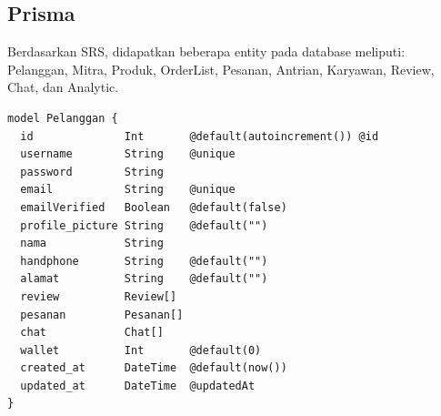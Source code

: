 \subsection{Prisma}
Berdasarkan SRS, didapatkan beberapa entity pada database meliputi: Pelanggan, Mitra, Produk, OrderList, Pesanan, Antrian, Karyawan, Review, Chat, dan Analytic.
\begin{lstlisting}[caption={Prisma Scheme},label={lst:scheme}]
model Pelanggan {
  id              Int       @default(autoincrement()) @id
  username        String    @unique
  password        String
  email           String    @unique
  emailVerified   Boolean   @default(false)
  profile_picture String    @default("")
  nama            String
  handphone       String    @default("")
  alamat          String    @default("")
  review          Review[]
  pesanan         Pesanan[]
  chat            Chat[]
  wallet          Int       @default(0)
  created_at      DateTime  @default(now())
  updated_at      DateTime  @updatedAt
}


\end{lstlisting}
